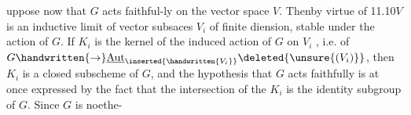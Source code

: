 uppose now  that $G$ acts faithful-\linebreak ly on the vector space $V$. Then\handwritten{,}by virtue of 11.10\handwritten{,}$V$ is an inductive limit of vector subsaces $V_i$ of finite diension, stable under the action of $G$. If $K_i$ is the kernel of the induced action of $G$ on $V_i$ , i.e. of $G\handwritten{\to}\underline{\operatorname{Aut}}_{\inserted{\handwritten{V_i}}}\deleted{\unsure{(V_i)}}$, then $K_i$ is a closed subscheme of $G$, and the hypothesis that $G$ acts faithfully is at once expressed by the fact that  the intersection of the $K_i$ is the identity subgroup of $G$. Since $G$ is noethe-%
